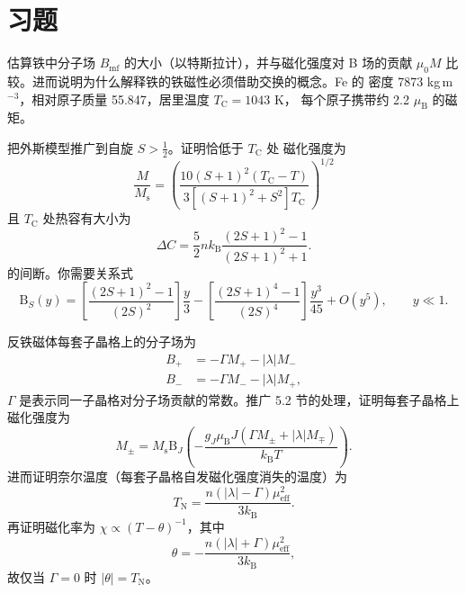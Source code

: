 \section*{习题}

 估算铁中分子场 $B_{\mathrm{mf}}$ 的大小（以特斯拉计），并与磁化强度对
B 场的贡献 $\mu_0M$ 比较。进而说明为什么解释铁的铁磁性必须借助交换的概念。Fe 的
密度 7873 kg\,m$^{-3}$，相对原子质量 55.847，居里温度 $T_{\mathrm{C}}=1043$ K，
每个原子携带约 2.2 $\mu_{\mathrm{B}}$ 的磁矩。

 把外斯模型推广到自旋 $S>\frac{1}{2}$。证明恰低于 $T_{\mathrm{C}}$ 处
磁化强度为
\begin{equation*}
\frac{M}{M_{\mathrm{s}}} = \left(\frac{10(S+1)^{2}(T_{\mathrm{C}}-T)}{3[(S+1)^{2}+S^{2}]T_{\mathrm{C}}}\right)^{1/2}\tag{5.36}
\end{equation*}
且 $T_{\mathrm{C}}$ 处热容有大小为
\begin{equation*}
\Delta C = \frac{5}{2}nk_{\mathrm{B}}\frac{(2S+1)^{2}-1}{(2S+1)^{2}+1}.\tag{5.37}
\end{equation*}
的间断。你需要关系式
\begin{equation*}
\mathrm{B}_S(y) = \left[\frac{(2S+1)^{2}-1}{(2S)^{2}}\right]\frac{y}{3} - \left[\frac{(2S+1)^{4}-1}{(2S)^{4}}\right]\frac{y^{3}}{45} + O(y^{5}),\qquad y\ll1.\tag{5.38}
\end{equation*}

 反铁磁体每套子晶格上的分子场为
\begin{equation*}
\begin{aligned}
B_{+} &= -\Gamma M_{+} - |\lambda|M_{-}\\
B_{-} &= -\Gamma M_{-} - |\lambda|M_{+},
\end{aligned}\tag{5.39}
\end{equation*}
$\Gamma$ 是表示同一子晶格对分子场贡献的常数。推广 5.2 节的处理，证明每套子晶格上
磁化强度为
\begin{equation*}
M_{\pm} = M_{\mathrm{s}}\mathrm{B}_J\left(-\frac{g_J\mu_{\mathrm{B}}J(\Gamma M_{\pm}+|\lambda|M_{\mp})}{k_{\mathrm{B}}T}\right).\tag{5.40}
\end{equation*}
进而证明奈尔温度（每套子晶格自发磁化强度消失的温度）为
\begin{equation*}
T_{\mathrm{N}} = \frac{n(|\lambda|-\Gamma)\mu_{\mathrm{eff}}^{2}}{3k_{\mathrm{B}}}.\tag{5.41}
\end{equation*}
再证明磁化率为 $\chi\propto(T-\theta)^{-1}$，其中
\begin{equation*}
\theta = -\frac{n(|\lambda|+\Gamma)\mu_{\mathrm{eff}}^{2}}{3k_{\mathrm{B}}},\tag{5.42}
\end{equation*}
故仅当 $\Gamma=0$ 时 $|\theta|=T_{\mathrm{N}}$。

